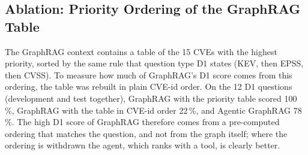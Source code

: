 \documentclass[12pt, a4paper]{article}
\begin{document}
\subsection{Ablation: Priority Ordering of the GraphRAG Table}\label{sec:ablation}
The GraphRAG context contains a table of the 15 CVEs with the highest priority, sorted by the same rule that question type D1 states (KEV, then EPSS, then CVSS). To measure how much of GraphRAG's D1 score comes from this ordering, the table was rebuilt in plain CVE-id order. On the 12 D1 questions (development and test together), GraphRAG with the priority table scored 100\,\%, GraphRAG with the table in CVE-id order 22\,\%, and Agentic GraphRAG 78\,\%. The high D1 score of GraphRAG therefore comes from a pre-computed ordering that matches the question, and not from the graph itself; where the ordering is withdrawn the agent, which ranks with a tool, is clearly better.
\end{document}
